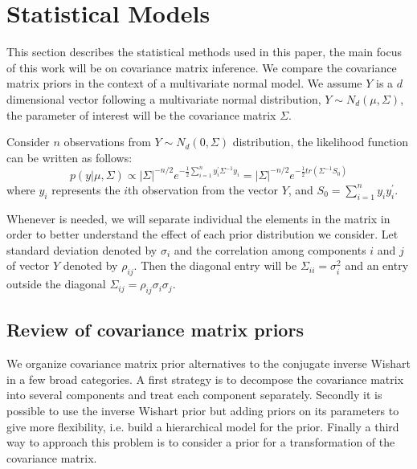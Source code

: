 \documentclass{article}
\begin{document}
\section{Statistical Models}
This section describes the statistical methods used in this paper, the main focus of this work will be on covariance matrix inference.  We compare the covariance matrix priors in the context of a  multivariate normal model. We assume  $Y$  is a $d$ dimensional vector following a multivariate normal distribution, $Y \sim N_d(\mu, \Sigma)$, the parameter of interest will be the covariance matrix $\Sigma$. 

 Consider $n$ observations from $Y \sim N_d(0, \Sigma)$ distribution, the likelihood function can be written as follows:  
  \begin{equation}
 p(y\vert \mu,\Sigma) \propto |\Sigma|^{-n/2} e^{- \frac{1}{2} \sum_{i=1}^n y_i^{'} \Sigma^{-1} y_i  } = |\Sigma|^{-n/2} e^{- \frac{1}{2}  tr(\Sigma^{-1}S_0)  } 
 \label{like}
 \end{equation} 
where $y_i$ represents the $i$th  observation from the vector $Y$, and $S_0=\sum_{i=1}^n y_i y_i ^{'}$.  

Whenever is needed, we will separate individual the elements in the matrix in order to better understand the effect of each prior distribution we consider. Let standard deviation denoted by $\sigma_i$ and the correlation among components $i$ and $j$ of vector $Y$ denoted by $\rho_{ij}$. Then the diagonal entry will be $\Sigma_{ii} = \sigma_i^2$ and an entry outside the diagonal $\Sigma_{ij} = \rho_{ij}\sigma_i\sigma_j$. 

\subsection{Review of covariance matrix priors}
We organize covariance matrix prior alternatives to the conjugate inverse Wishart in a few broad categories. A first strategy is to decompose the covariance matrix into several components and treat each component separately. Secondly it is possible to use the inverse Wishart prior but adding priors on its parameters to give more flexibility, i.e. build a hierarchical model for the prior. Finally a third way to approach this problem is to consider a prior for a transformation of the covariance matrix. 
\end{document}
